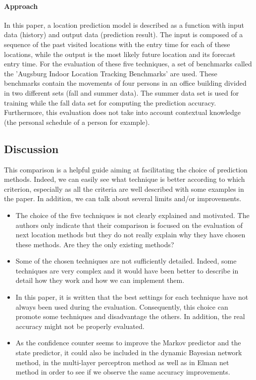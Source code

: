 \paragraph{Approach}
In this paper, a location prediction model is described as a function with input data (history) and output data (prediction result). The input is composed of a sequence of the past visited locations with the entry time for each of these locations, while the output is the most likely future location and its forecast entry time. For the evaluation of these five techniques, a set of benchmarks called the 'Augsburg Indoor Location Tracking Benchmarks' are used. These benchmarks contain the movements of four persons in an office building divided in two different sets (fall and summer data). The summer data set is used for training while the fall data set for computing the prediction accuracy. Furthermore, this evaluation does not take into account contextual knowledge (the personal schedule of a person for example).

\subsection{Discussion} \label{lect2-disc}

This comparison is a helpful guide aiming at facilitating the choice of prediction methods. Indeed, we can easily see what technique is better according to which criterion, especially as all the criteria are well described with some examples in the paper. In addition, we can talk about several limits and/or improvements.

\begin{itemize}

\item The choice of the five techniques is not clearly explained and motivated. The authors only indicate that their comparison is focused on the evaluation of next location methods but they do not really explain why they have chosen these methods. Are they the only existing methods?

\item Some of the chosen techniques are not sufficiently detailed. Indeed, some techniques are very complex and it would have been better to describe in detail how they work and how we can implement them.

\item In this paper, it is written that the best settings for each technique have not always been used during the evaluation. Consequently, this choice can promote some techniques and disadvantage the others. In addition, the real accuracy might not be properly evaluated.

\item As the confidence counter seems to improve the Markov predictor and the state predictor, it could also be included in the dynamic Bayesian network method, in the multi-layer perceptron method as well as in Elman net method in order to see if we observe the same accuracy improvements.

\end{itemize}